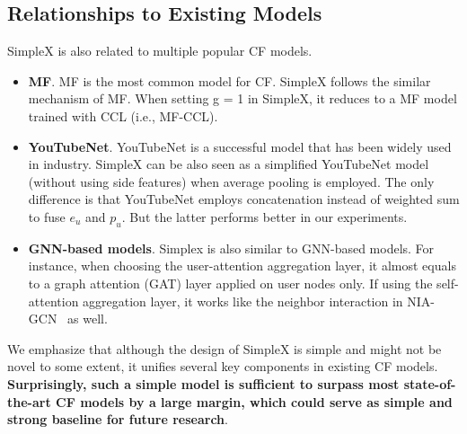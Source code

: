 \documentclass[sigconf,authorversion]{acmart}
\begin{document}
\subsection{Relationships to Existing Models}
SimpleX is also related to multiple popular CF models. 
\begin{itemize}
    \item \textbf{MF}. MF is the most common model for CF. SimpleX follows the similar mechanism of MF. When setting g = 1 in SimpleX, it reduces to a MF model trained with CCL (i.e., MF-CCL).
    
    \item \textbf{YouTubeNet}. YouTubeNet is a successful model that has been widely used in industry. SimpleX can be also seen as a simplified YouTubeNet model (without using side features) when average pooling is employed. The only difference is that YouTubeNet employs concatenation instead of weighted sum to fuse $e_u$ and $p_u$. But the latter performs better in our experiments.
    
    \item \textbf{GNN-based models}. Simplex is also similar to GNN-based models. For instance, when choosing the user-attention aggregation layer, it almost equals to a graph attention (GAT) layer applied on user nodes only. If using the self-attention aggregation layer, it works like the neighbor interaction in NIA-GCN~\cite{NIA-GCN} as well.  
\end{itemize}

We emphasize that although the design of SimpleX is simple and might not be novel to some extent, it unifies several key components in existing CF models. \textbf{Surprisingly, such a simple model is sufficient to surpass most state-of-the-art CF models by a large margin, which could serve as simple and strong baseline for future research}. 






 
\end{document}
